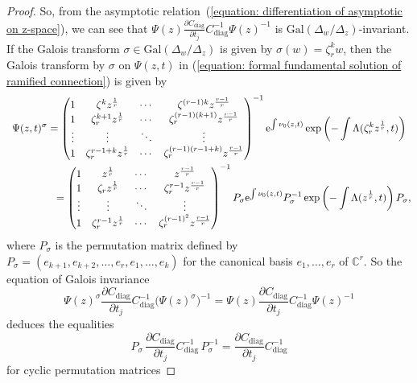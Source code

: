 \documentclass[pdftex]{sigma}
\numberwithin{equation}{section}
\begin{document}
\begin{proof}
So, from the asymptotic relation~(\ref{equation: differentiation of asymptotic on z-space}),
we can see that
$\Psi(z) \frac {\partial C_{\mathrm{diag}}} {\partial t_j}
C_{\mathrm{diag}}^{-1} \Psi(z)^{-1}$
is $\mathrm{Gal}(\Delta_w/\Delta_z)$-invariant.
If the Galois transform
$\sigma\in \mathrm{Gal}(\Delta_w/\Delta_z)$
is given by
$\sigma(w)=\zeta_r^kw$,
then the Galois transform by $\sigma$ on
$\Psi(z,t)$ in
(\ref{equation: formal fundamental solution of ramified connection})
is given by
\begin{gather*}
 \Psi(z,t)^{\sigma}
 =
 \begin{pmatrix}
 1 & \zeta^k z^{\frac{1}{r}} & \cdots & \zeta^{(r-1)k}z^{\frac{r-1}{r}} \\
 1 & \zeta_r^{k+1} z^{\frac{1}{r}} & \cdots & \zeta_r^{(r-1)(k+1)}z^{\frac{r-1}{r}} \\
 \vdots & \vdots & \ddots & \vdots \\
 1 & \zeta_r^{r-1+k}z^{\frac{1}{r}} & \cdots & \zeta_r^{(r-1)(r-1+k)}z^{\frac{r-1}{r}}
 \end{pmatrix}^{-1}
 {\rm e}^{\int\nu_0(z,t)}
 \exp\left({-} \int\Lambda(\zeta_r^k z^{\frac{1}{r}},t) \right)
 \\
\hphantom{\Psi(z,t)^{\sigma}=}{} =
 \begin{pmatrix}
 1 & z^{\frac{1}{r}} & \cdots & z^{\frac{r-1}{r}} \\
 1 & \zeta_r z^{\frac{1}{r}} & \cdots & \zeta_r^{r-1}z^{\frac{r-1}{r}} \\
 \vdots & \vdots & \ddots & \vdots \\
 1 & \zeta_r^{r-1}z^{\frac{1}{r}} & \cdots & \zeta_r^{(r-1)^2}z^{\frac{r-1}{r}}
 \end{pmatrix}^{-1}
 P_{\sigma}
 {\rm e}^{\int\nu_0(z,t)}
 P_{\sigma}^{-1}
 \exp\left({-} \int\Lambda(z^{\frac{1}{r}},t) \right)
 P_{\sigma},
\end{gather*}
where $P_{\sigma}$ is the permutation matrix
defined by
$P_{\sigma}=(e_{k+1},e_{k+2},\dots,e_r,e_1,\dots,e_k)$
for the canonical basis
$e_1,\dots,e_r$ of $\mathbb{C}^r$.
So the equation of Galois invariance
\[
 \Psi(z)^{\sigma} \frac{\partial C_{\mathrm{diag}}}{\partial t_j} C_{\mathrm{diag}}^{-1}
 \big(\Psi(z)^{\sigma}\big)^{-1}
 =
 \Psi(z) \frac {\partial C_{\mathrm{diag}}} {\partial t_j}
 C_{\mathrm{diag}}^{-1} \Psi(z)^{-1}
\]
deduces the equalities
\[
 P_{\sigma} \, \frac {\partial C_{\mathrm{diag}}} {\partial t_j}
 C_{\mathrm{diag}}^{-1} \, P_{\sigma}^{-1}
 =
\frac {\partial C_{\mathrm{diag}}} {\partial t_j}
 C_{\mathrm{diag}}^{-1}
\]
for cyclic permutation matrices

\end{proof}
\end{document}
